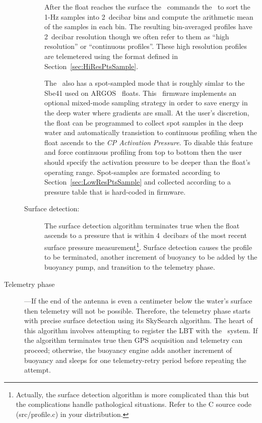 \begin{description}
\begin{description}
    After the float reaches the surface the \apf\ commands the \sbe\ to sort
    the 1-Hz samples into 2~decibar bins and compute the arithmetic mean of
    the samples in each bin.  The resulting bin-averaged profiles have
    2~decibar resolution though we often refer to them as ``high
    resolution'' or ``continuous profiles''.  These high resolution profiles
    are telemetered using the format defined in
    Section~\ref{sec:HiResPtsSample}.
    
    The \sbe\ also has a spot-sampled mode that is roughly simlar to the
    Sbe41 used on ARGOS \apex\ floats.  This \iridium\ firmware implements an
    optional mixed-mode sampling strategy in order to save energy in the
    deep water where gradients are small.  At the user's discretion, the
    float can be programmed to collect spot samples in the deep water and
    automatically transistion to continuous profiling when the float ascends
    to the \emph{CP Activation Pressure}.  To disable this feature and force
    continuous profiling from top to bottom then the user should specify the
    activation pressure to be deeper than the float's operating range.
    Spot-samples are formated according to Section~\ref{sec:LowResPtsSample}
    and collected according to a pressure table that is hard-coded in
    firmware.
    
  \item[Surface detection:] The surface detection algorithm terminates true
    when the float ascends to a pressure that is within 4~decibars of the
    most recent surface pressure measurement\footnote{Actually, the surface
      detection algorithm is more complicated than this but the
      complications handle pathological situations.  Refer to the C source
      code (src/profile.c) in your distribution.}.  Surface detection causes
    the profile to be terminated, another increment of buoyancy to be
    added by the buoyancy pump, and transition to the telemetry phase.
  \end{description}

\item[Telemetry phase\label{TelemetryPhase}]---If the end of the antenna is
  even a centimeter below the water's surface then telemetry will not be
  possible.  Therefore, the telemetry phase starts with precise surface
  detection using its SkySearch algorithm.  The heart of this algorithm
  involves attempting to register the LBT with the \iridium\ system.  If the
  algorithm terminates true then GPS acquisition and telemetry can proceed;
  otherwise, the buoyancy engine adds another increment of buoyancy and
  sleeps for one telemetry-retry period before repeating the attempt.


\end{description}
